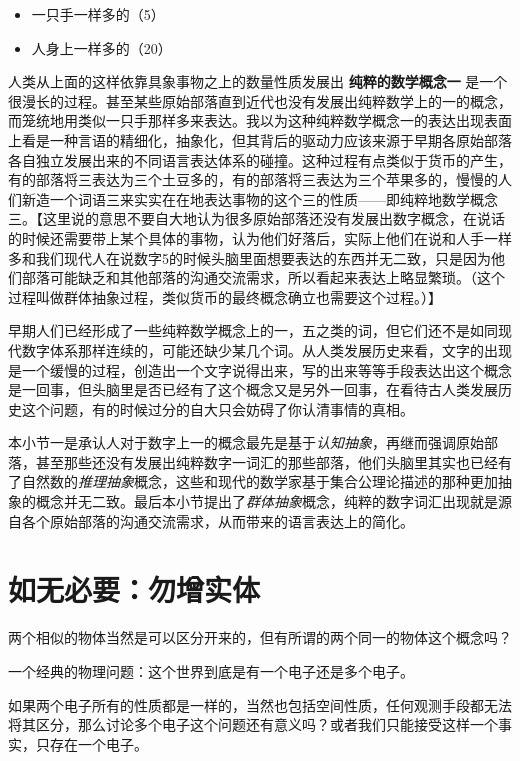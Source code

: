 \documentclass[12pt,oneside]{book}
\begin{document}
\begin{itemize}
\item 一只手一样多的（5）
\item 人身上一样多的（20）
\end{itemize}

人类从上面的这样依靠具象事物之上的数量性质发展出 \textbf{纯粹的数学概念一} 是一个很漫长的过程。甚至某些原始部落直到近代也没有发展出纯粹数学上的一的概念，而笼统地用类似一只手那样多来表达。我以为这种纯粹数学概念一的表达出现表面上看是一种言语的精细化，抽象化，但其背后的驱动力应该来源于早期各原始部落各自独立发展出来的不同语言表达体系的碰撞。这种过程有点类似于货币的产生，有的部落将三表达为三个土豆多的，有的部落将三表达为三个苹果多的，慢慢的人们新造一个词语三来实实在在地表达事物的这个三的性质——即纯粹地数学概念三。【这里说的意思不要自大地认为很多原始部落还没有发展出数字概念，在说话的时候还需要带上某个具体的事物，认为他们好落后，实际上他们在说和人手一样多和我们现代人在说数字5的时候头脑里面想要表达的东西并无二致，只是因为他们部落可能缺乏和其他部落的沟通交流需求，所以看起来表达上略显繁琐。（这个过程叫做群体抽象过程，类似货币的最终概念确立也需要这个过程。）】

早期人们已经形成了一些纯粹数学概念上的一，五之类的词，但它们还不是如同现代数字体系那样连续的，可能还缺少某几个词。从人类发展历史来看，文字的出现是一个缓慢的过程，创造出一个文字说得出来，写的出来等等手段表达出这个概念是一回事，但头脑里是否已经有了这个概念又是另外一回事，在看待古人类发展历史这个问题，有的时候过分的自大只会妨碍了你认清事情的真相。

本小节一是承认人对于数字上一的概念最先是基于\emph{认知抽象}，再继而强调原始部落，甚至那些还没有发展出纯粹数字一词汇的那些部落，他们头脑里其实也已经有了自然数的\emph{推理抽象}概念，这些和现代的数学家基于集合公理论描述的那种更加抽象的概念并无二致。最后本小节提出了\emph{群体抽象}概念，纯粹的数字词汇出现就是源自各个原始部落的沟通交流需求，从而带来的语言表达上的简化。



\section{如无必要：勿增实体}
两个相似的物体当然是可以区分开来的，但有所谓的两个同一的物体这个概念吗？

一个经典的物理问题：这个世界到底是有一个电子还是多个电子。

如果两个电子所有的性质都是一样的，当然也包括空间性质，任何观测手段都无法将其区分，那么讨论多个电子这个问题还有意义吗？或者我们只能接受这样一个事实，只存在一个电子。
\end{document}
